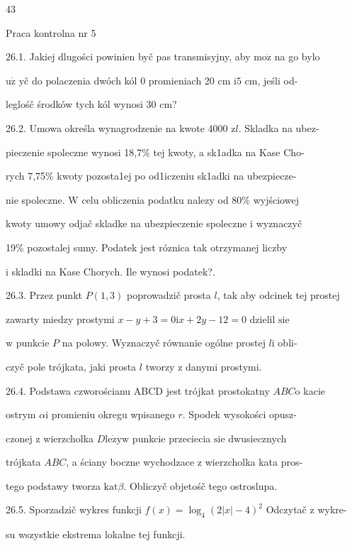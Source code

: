 \documentclass[a4paper,12pt]{article}
\begin{document}
43

Praca kontrolna nr 5

26.1. Jakiej dlugości powinien byč pas transmisyjny, aby $\mathrm{m}\mathrm{o}\dot{\mathrm{z}}$ na go bylo

$\mathrm{u}\dot{\mathrm{z}}$ yč do polaczenia dwóch kól $0$ promieniach 20 cm $\mathrm{i}5$ cm, jeśli od-

leglośč środków tych kól wynosi 30 cm?

26.2. Umowa określa wynagrodzenie na kwote 4000 $\mathrm{z}l$. Skladka na ubez-

pieczenie spoleczne wynosi 18,7\% tej kwoty, a sk1adka na Kase Cho-

rych 7,75\% kwoty pozosta1ej po od1iczeniu sk1adki na ubezpiecze-

nie spoleczne. $\mathrm{W}$ celu obliczenia podatku nalezy od 80\% wyjściowej

kwoty umowy odjač skladke na ubezpieczenie spoleczne $\mathrm{i}$ wyznaczyč

19\% pozostalej sumy. Podatek jest róznica tak otrzymanej liczby

$\mathrm{i}$ skladki na Kase Chorych. Ile wynosi podatek?.

26.3. Przez punkt $P(1,3)$ poprowadzič prosta $l$, tak aby odcinek tej prostej

zawarty miedzy prostymi $x-y+3=0\mathrm{i}x+2y-12=0$ dzielil $\mathrm{s}\mathrm{i}\mathrm{e}$

$\mathrm{w}$ punkcie $P$ na polowy. Wyznaczyč równanie ogólne prostej $l\mathrm{i}$ obli-

czyč pole trójkata, jaki prosta $l$ tworzy $\mathrm{z}$ danymi prostymi.

26.4. Podstawa czworościanu ABCD jest trójkat prostokatny $ABC\mathrm{o}$ kacie

ostrym $\alpha \mathrm{i}$ promieniu okregu wpisanego $r$. Spodek wysokości opusz-

czonej $\mathrm{z}$ wierzcholka $D \mathrm{l}\mathrm{e}\dot{\mathrm{z}}\mathrm{y}\mathrm{w}$ punkcie przeciecia $\mathrm{s}\mathrm{i}\mathrm{e}$ dwusiecznych

trójkata $ABC$, a ściany boczne wychodzace $\mathrm{z}$ wierzcholka kata pros-

tego podstawy tworza $\mathrm{k}\mathrm{a}\mathrm{t}\beta$. Obliczyč objetośč tego ostroslupa.

26.5. Sporzadzič wykres funkcji $f(x)=\log_{4}(2|x|-4)^{2}$ Odczytač $\mathrm{z}$ wykre-

su wszystkie ekstrema lokalne tej funkcji.
\end{document}
